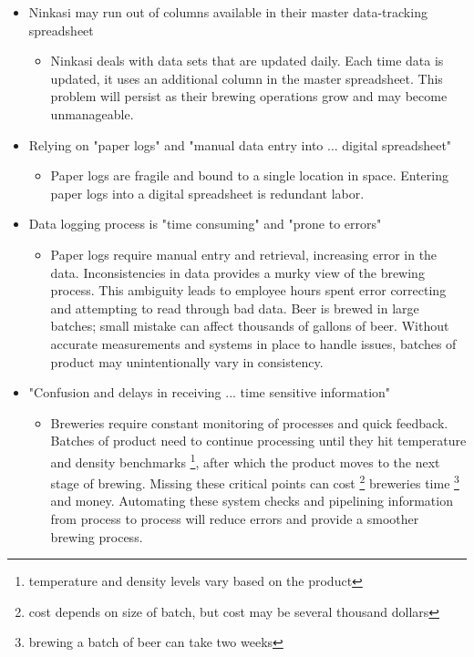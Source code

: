 \documentclass[draftclsnofoot,onecolumn,letterpaper,10pt]{IEEEtran}
\begin{document}
\begin{itemize}
	\item {Ninkasi may run out of columns available in their master data-tracking spreadsheet}
  \begin{itemize}
	  \item {
			Ninkasi deals with data sets that are updated daily.
			Each time data is updated, it uses an additional column in the master spreadsheet.
			This problem will persist as their brewing operations grow and may become unmanageable.
		}
	\end{itemize}

	\item {Relying on "paper logs" and "manual data entry into ... digital spreadsheet"}
  \begin{itemize}
		\item {
			Paper logs are fragile and bound to a single location in space.
			Entering paper logs into a digital spreadsheet is redundant labor.
		}
  \end{itemize}

	\item {Data logging process is "time consuming" and "prone to errors"}
	\begin{itemize}
		\item {
			Paper logs require manual entry and retrieval, increasing error in the data.
			Inconsistencies in data provides a murky view of the brewing process.
			This ambiguity leads to employee hours spent error correcting and attempting to read through bad data.
			Beer is brewed in large batches; small mistake can affect thousands of gallons of beer.
			Without accurate measurements and systems in place to handle issues, batches of product may unintentionally vary in consistency.
		}
	\end{itemize}

	\item {"Confusion and delays in receiving ... time sensitive information"}
	\begin{itemize}
		\item {
			Breweries require constant monitoring of processes and quick feedback.
			Batches of product need to continue processing until they hit temperature and density benchmarks \footnote{temperature and density levels vary based on the product}, after which the product moves to the next stage of brewing.
			Missing these critical points can cost \footnote{cost depends on size of batch, but cost may be several thousand dollars} breweries time \footnote{brewing a batch of beer can take two weeks} and money.
			Automating these system checks and pipelining information from process to process will reduce errors and provide a smoother brewing process.
		}
	\end{itemize}


\end{itemize}
\end{document}
